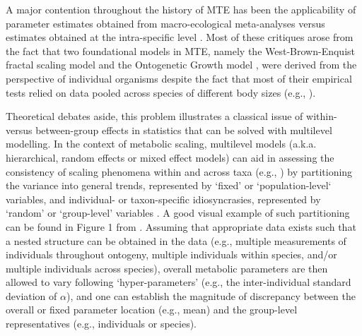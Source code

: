\documentclass[a4paper,12pt]{article}
\begin{document}
A major contention throughout the history of MTE has been the applicability of parameter estimates obtained from macro-ecological meta-analyses versus estimates obtained at the intra-specific level \cite{brody1945book, peters1983book, agutter2004theor, glazier2005biolrev, moses2008amnat, hirst2014ele, barneche2015pnas}. Most of these critiques arose from the fact that two foundational models in MTE, namely the West-Brown-Enquist fractal scaling model \cite{west1997science} and the Ontogenetic Growth model \cite{west2001nature}, were derived from the perspective of individual organisms despite the fact that most of their empirical tests relied on data pooled across species of different body sizes (e.g., \cite{brown2004ecology, savage2004amnat}). 

Theoretical debates aside, this problem illustrates a classical issue of within- versus between-group effects in statistics that can be solved with multilevel modelling. In the context of metabolic scaling, multilevel models (a.k.a. hierarchical, random effects or mixed effect models) can aid in assessing the consistency of scaling phenomena within and across taxa (e.g., \cite{glazier2005biolrev, isaac2010ele, hirst2014ele, barneche2015pnas}) by partitioning the variance into general trends, represented by `fixed' or `population-level` variables, and individual- or taxon-specific idiosyncrasies, represented by `random' or `group-level' variables \cite{vandepol2009animbehav, allgeier2015pnas, padfield2016ecollett, barneche2019functecol, garzke2019plosbiol, barton2020ele}. A good visual example of such partitioning can be found in Figure 1 from \cite{vandepol2009animbehav}. Assuming that appropriate data exists such that a nested structure can be obtained in the data (e.g., multiple measurements of individuals throughout ontogeny, multiple individuals within species, and/or multiple individuals across species), overall metabolic parameters are then allowed to vary following `hyper-parameters' (e.g., the inter-individual standard deviation of $\alpha$), and one can establish the magnitude of discrepancy between the overall or fixed parameter location (e.g., mean) and the group-level representatives (e.g., individuals or species).
\end{document}
